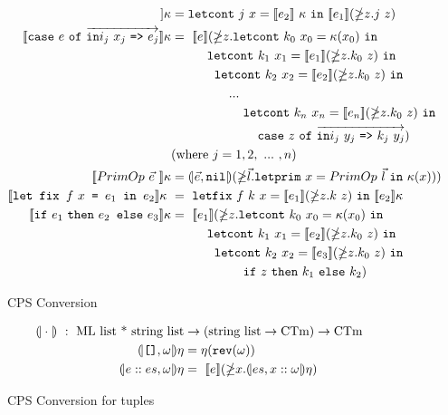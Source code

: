 \documentclass{article}
\theoremstyle{definition}
\theoremstyle{remark}
\numberwithin{equation}{section}
\begin{document}
\begin{figure}[!ht]
\begin{align*}
  [\![\texttt{let\ val}\ x=e_1\ \texttt{in}\ e_2\ \texttt{end}]\!]\kappa
   &= \texttt{letcont}\ j\ x=[\![e_2]\!]\ \kappa\ \texttt{in}
            \ [\![e_1]\!](\mathbb{\Lambda}z.j\ z)\\     %
  \kern-1.2cm [\![\texttt{case}\ e\ \texttt{of}
  \ \overrightarrow{\texttt{in}i_j\ x_j\ \texttt{=>}\ e_j}]\!]\kappa
     &=\ [\![e]\!](\mathbb{\Lambda}z.\texttt{letcont}\ k_0\ x_0=
            \kappa (x_0)\ \texttt{in}\\
         &\kern1cm   \texttt{letcont}\ k_1\ x_1=
            [\![e_1]\!](\mathbb{\Lambda}z.k_0\ z)\ \texttt{in}\\
     &\kern1.2cm \texttt{letcont}\ k_2\ x_2=[\![e_2]\!]
        (\mathbb{\Lambda}z.k_0\ z)\ \texttt{in}\\
     &\kern1.6cm  ...\\
      &\kern2cm \texttt{letcont}\ k_n\ x_n=[\![e_n]\!]
        (\mathbb{\Lambda}z.k_0\ z)\ \texttt{in}\\
      & \kern2.4cm \texttt{case}\ z\ \texttt{of}
      \ \overrightarrow{\texttt{in}i_j\ y_j\ \texttt{=>}\ k_j\ y_j})\\
      & (\textrm{where}\ j = 1,2,\ ...\ ,n)\\    %
     \env{PrimOp\ \vec{e}\ }
       &=\round{\vec{e}, \texttt{nil}}(\mathbb{\Lambda}\vec{l}.   \texttt{letprim}
       \ x=PrimOp\ \vec{l}\ \texttt{in}\ \kappa (x)))\\  %
   \env{\texttt{let fix }f\ x\texttt{ = }e_1 \texttt{ in }e_2}\  &=
   \ \texttt{letfix}\ f\ k\ x=[\![e_1]\!]
    (\mathbb{\Lambda}z.k\ z)\ \texttt{in}\ \env{e_2}\\     %
    \kern-1.2cm [\![\texttt{if}\ e_1\ \texttt{then}\ e_2
        \texttt{ else}\ e_3]\!]\kappa
     &=\ [\![e_1]\!](\mathbb{\Lambda}z.\texttt{letcont}\ k_0\ x_0=
            \kappa (x_0)\ \texttt{in}\\
         &\kern1cm   \texttt{letcont}\ k_1\ x_1=
            [\![e_2]\!](\mathbb{\Lambda}z.k_0\ z)\ \texttt{in}\\
     &\kern1.2cm     \texttt{letcont}\ k_2\ x_2=[\![e_3]\!]
        (\mathbb{\Lambda}z.k_0\ z)\ \texttt{in}\\
     &\kern2cm    \texttt{if}\ z\ \texttt{then}\ k_1\ \texttt{else}\ k_2)    %
\end{align*}
  \caption{CPS Conversion}
  \label{fig-sub}
\end{figure}

\begin{figure}[!ht]
  \centering
\begin{align*}
    \round{\cdot}\ :\ \textrm{ML list * string list}&\to(\textrm{string list}\to
     \textrm{CTm})\to \textrm{CTm}\\     %
     \round{\texttt{[]}, \omega}\eta
        &=\eta (\texttt{rev} (\omega))\\   %
     \round{e::es, \omega}\eta
       &=\  [\![e]\!](\mathbb{\Lambda}x.
          \round{es,x::\omega}\eta )     %
\end{align*}

  \caption{CPS Conversion for tuples}
  \label{fig-sub}
\end{figure}
\end{document}
